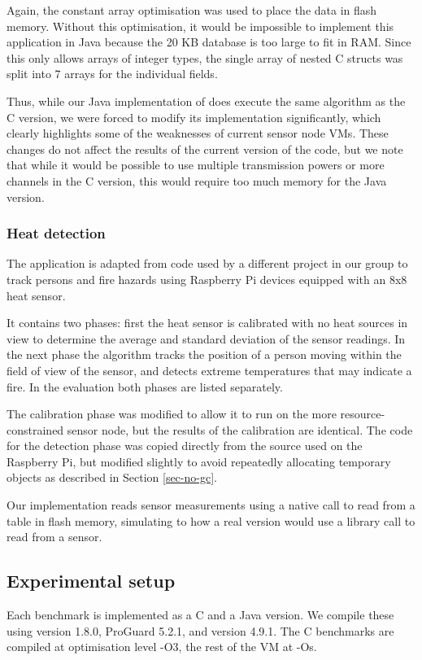 Again, the constant array optimisation was used to place the data in flash memory. Without this optimisation, it would be impossible to implement this application in Java because the 20 KB database is too large to fit in RAM. Since this only allows arrays of integer types, the single array of nested C structs was split into 7 arrays for the individual fields.

Thus, while our Java implementation of  does execute the same algorithm as the C version, we were forced to modify its implementation significantly, which clearly highlights some of the weaknesses of current sensor node VMs. These changes do not affect the results of the current version of the code, but we note that while it would be possible to use multiple transmission powers or more channels in the C version, this would require too much memory for the Java version.

\subsubsection{Heat detection}
The  application is adapted from code used by a different project in our group to track persons and fire hazards using Raspberry Pi devices equipped with an 8x8 heat sensor.

It contains two phases: first the heat sensor is calibrated with no heat sources in view to determine the average and standard deviation of the sensor readings. In the next phase the algorithm tracks the position of a person moving within the field of view of the sensor, and detects extreme temperatures that may indicate a fire. In the evaluation both phases are listed separately.

The calibration phase was modified to allow it to run on the more resource-constrained sensor node, but the results of the calibration are identical. The code for the detection phase was copied directly from the source used on the Raspberry Pi, but modified slightly to avoid repeatedly allocating temporary objects as described in Section \ref{sec-no-gc}.

Our implementation reads sensor measurements using a native call to read from a table in flash memory, simulating to how a real version would use a library call to read from a sensor.


\subsection{Experimental setup}
Each benchmark is implemented as a C and a Java version. We compile these using  version 1.8.0, ProGuard 5.2.1, and  version 4.9.1. The C benchmarks are compiled at optimisation level -O3, the rest of the VM at -Os.

